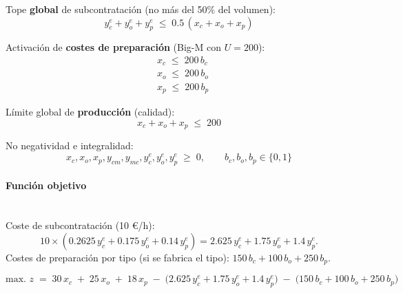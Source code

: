 Tope \textbf{global} de subcontratación (no más del 50\% del volumen):
\begin{equation}
    y_c^{e} + y_o^{e} + y_p^{e} \;\leq\; 0.5\,(x_c + x_o + x_p)
\end{equation}

Activación de \textbf{costes de preparación} (Big-M con $U=200$):
\begin{align}
    & x_c \;\leq\; 200\,b_c \\
    & x_o \;\leq\; 200\,b_o \\
    & x_p \;\leq\; 200\,b_p
\end{align}

Límite global de \textbf{producción} (calidad):
\begin{equation}
    x_c + x_o + x_p \;\leq\; 200
\end{equation}

No negatividad e integralidad:
\begin{equation}
    x_c, x_o, x_p, y_{cm}, y_{mc}, y_c^{e}, y_o^{e}, y_p^{e} \;\geq\; 0,
    \qquad b_c, b_o, b_p \in \{0,1\}
\end{equation}

\paragraph{Función objetivo}\mbox{}\\
Coste de subcontratación (10 €/h):
\[
10 \times (0.2625\,y_c^{e} + 0.175\,y_o^{e} + 0.14\,y_p^{e})
= 2.625\,y_c^{e} + 1.75\,y_o^{e} + 1.4\,y_p^{e}.
\]
Costes de preparación por tipo (si se fabrica el tipo): $150\,b_c + 100\,b_o + 250\,b_p$.

\begin{equation}
\mbox{max. } z \;=\; 30\,x_c \;+\; 25\,x_o \;+\; 18\,x_p 
\;-\; \Big(2.625\,y_c^{e} + 1.75\,y_o^{e} + 1.4\,y_p^{e}\Big)
\;-\; \big(150\,b_c + 100\,b_o + 250\,b_p\big)
\end{equation}

